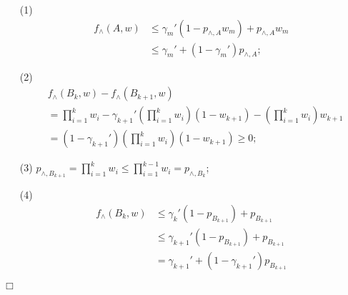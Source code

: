 \documentclass{article}
\newenvironment{proof}{\noindent {\textbf{Proof. }}}{$\Box$ \medskip}
\begin{document}
\begin{proof}
\begin{itemize}
\item[(1)]
\begin{align*}
f_{\wedge}(A, w) &\leq \gamma_m'(1 - p_{\wedge, A} w_m) + p_{\wedge, A} w_m \\
&\leq \gamma_m' + (1 - \gamma_m') p_{\wedge, A};
\end{align*}

\item[(2)]
\begin{align*}
&f_{\wedge}(B_k, w) - f_{\wedge}(B_{k+1}, w)\\
&=\prod_{i=1}^{k}w_i - \gamma_{k+1}' (\prod_{i=1}^{k}w_i) (1 - w_{k+1}) - (\prod_{i=1}^{k}w_i) w_{k+1}\\
&=(1 - \gamma_{k+1}') (\prod_{i=1}^{k}w_i) (1 - w_{k+1}) \geq 0;
\end{align*}

\item[(3)]
$p_{\wedge, B_{k+1}} = \prod_{i=1}^{k} w_i \leq \prod_{i=1}^{k-1} w_i = p_{\wedge, B_k}$;

\item[(4)]
\begin{align*}
f_{\wedge}(B_k, w) &\leq \gamma_{k}' (1 - p_{B_{k+1}}) + p_{B_{k+1}}\\
&\leq \gamma_{k+1}' (1 - p_{B_{k+1}}) + p_{B_{k+1}} \\
&= \gamma_{k+1}' + (1 - \gamma_{k+1}') p_{B_{k+1}}
\end{align*}
\end{itemize}
\end{proof}
\end{document}
